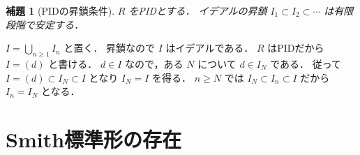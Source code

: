 \documentclass[a5paper,10pt,onecolumn]{jsarticle}
\makeatletter
\theoremstyle{mathnotetheorem}
\newtheorem{lemma}[theorem]{補題}
\renewcommand{\proofname}{証明}
\renewenvironment{proof}[1][\proofname]{%
  \par\pushQED{\qed}\normalfont\topsep4\p@\@plus2\p@\relax
  \trivlist\item[\hskip\labelsep\bfseries #1]\ignorespaces
}{\popQED\endtrivlist\@endpefalse}
\makeatother
\begin{document}
\begin{lemma}[PIDの昇鎖条件]\label{lem:acc}
$R$ をPIDとする．
イデアルの昇鎖
$I_1\subset I_2\subset\cdots$ は有限段階で安定する．
\end{lemma}
\begin{proof}
$I=\bigcup_{n\ge1}I_n$ と置く．
昇鎖なので $I$ はイデアルである．
$R$ はPIDだから $I=(d)$ と書ける．
$d\in I$ なので，ある $N$ について $d\in I_N$ である．
従って
$I=(d)\subset I_N\subset I$ となり $I_N=I$ を得る．
$n\ge N$ では $I_N\subset I_n\subset I$ だから
$I_n=I_N$ となる．
\end{proof}

\section{Smith標準形の存在}
\end{document}
